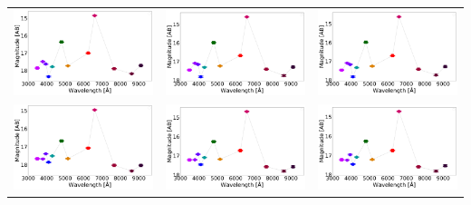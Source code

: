 \begin{table}
\begin{tabular}{ccc}
\includegraphics[width=0.3\linewidth, clip]{photopectrum_splus_MC0093-051819_aper.pdf} & \includegraphics[width=0.3\linewidth, clip]{photopectrum_splus_MC0093-051819_auto.pdf} & \includegraphics[width=0.3\linewidth, clip]{photopectrum_splus_MC0093-051819_petro.pdf} \\
\includegraphics[width=0.3\linewidth, clip]{photopectrum_splus_MC0093-085620_aper.pdf} & \includegraphics[width=0.3\linewidth, clip]{photopectrum_splus_MC0093-085620_auto.pdf} & \includegraphics[width=0.3\linewidth, clip]{photopectrum_splus_MC0093-085620_petro.pdf} \\

\end{tabular}
\end{table}
